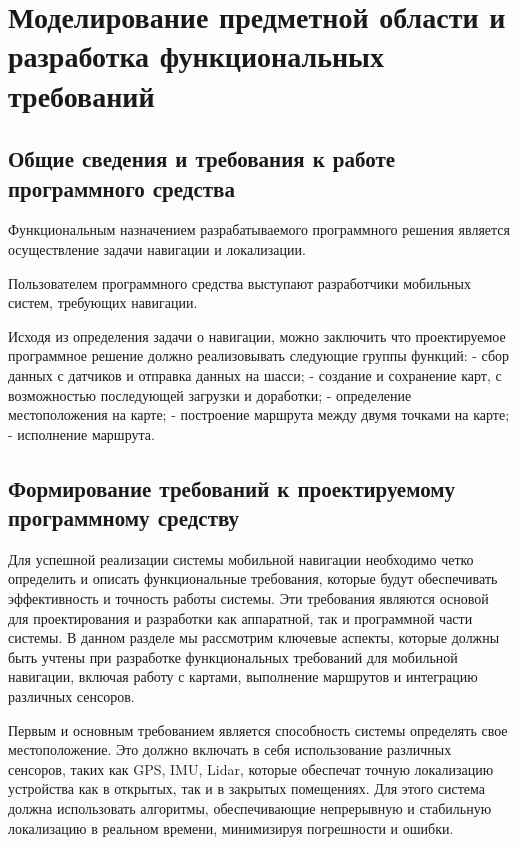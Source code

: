 \section{Моделирование предметной области и разработка функциональных
требований}

\subsection{Общие сведения и требования к работе программного средства}

\sloppy
Функциональным назначением разрабатываемого программного решения является
осуществление задачи навигации и локализации.

Пользователем программного средства выступают разработчики мобильных систем,
требующих навигации.

Исходя из определения задачи о навигации, можно заключить что проектируемое
программное решение должно реализовывать следующие группы функций:
- сбор данных с датчиков и отправка данных на шасси;
- создание и сохранение карт, с возможностью последующей загрузки и доработки;
- определение местоположения на карте;
- построение маршрута между двумя точками на карте;
- исполнение маршрута.

\subsection{Формирование требований к проектируемому программному средству}

Для успешной реализации системы мобильной навигации необходимо четко определить
и описать функциональные требования, которые будут обеспечивать эффективность и
точность работы системы. Эти требования являются основой для проектирования и
разработки как аппаратной, так и программной части системы. В данном разделе мы
рассмотрим ключевые аспекты, которые должны быть учтены при разработке
функциональных требований для мобильной навигации, включая работу с картами,
выполнение маршрутов и интеграцию различных сенсоров.

Первым и основным требованием является способность системы определять свое
местоположение. Это должно включать в себя использование различных сенсоров,
таких как GPS, IMU, Lidar, которые обеспечат точную локализацию устройства как в
открытых, так и в закрытых помещениях. Для этого система должна использовать
алгоритмы, обеспечивающие непрерывную и стабильную локализацию в реальном
времени, минимизируя погрешности и ошибки.

